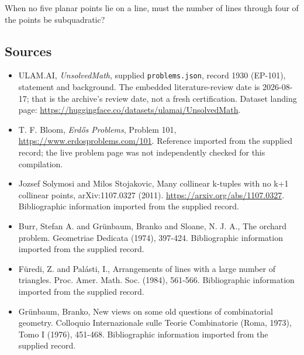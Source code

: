 \documentclass[11pt,a4paper]{article}
\begin{document}
When no five planar points lie on a line, must the number of lines through four of the points be subquadratic?

\subsection{Sources}

{\small

\begin{itemize}

\item[\hypertarget{source:1930:1}{S1}] ULAM.AI, \emph{UnsolvedMath}, supplied \texttt{problems.json}, record 1930 (EP-101), statement and background. The embedded literature-review date is 2026-08-17; that is the archive’s review date, not a fresh certification. Dataset landing page: \url{https://huggingface.co/datasets/ulamai/UnsolvedMath}.

\item[\hypertarget{source:1930:2}{S2}] T. F. Bloom, \emph{Erdős Problems}, Problem 101, \url{https://www.erdosproblems.com/101}. Reference imported from the supplied record; the live problem page was not independently checked for this compilation.

\item[\hypertarget{source:1930:3}{S3}] Jozsef Solymosi and Milos Stojakovic, Many collinear k-tuples with no k+1 collinear points, arXiv:1107.0327 (2011). \url{https://arxiv.org/abs/1107.0327}. Bibliographic information imported from the supplied record.

\item[\hypertarget{source:1930:4}{S4}] Burr, Stefan A. and Gr\"{u}nbaum, Branko and Sloane, N. J. A., The orchard problem. Geometriae Dedicata (1974), 397-424. Bibliographic information imported from the supplied record.

\item[\hypertarget{source:1930:5}{S5}] F\"{u}redi, Z. and Pal\'{a}sti, I., Arrangements of lines with a large number of triangles. Proc. Amer. Math. Soc. (1984), 561-566. Bibliographic information imported from the supplied record.

\item[\hypertarget{source:1930:6}{S6}] Gr\"{u}nbaum, Branko, New views on some old questions of combinatorial geometry. Colloquio Internazionale sulle Teorie Combinatorie (Roma, 1973), Tomo I (1976), 451-468. Bibliographic information imported from the supplied record.

\end{itemize}

}

\label{end:1930}
\end{document}
